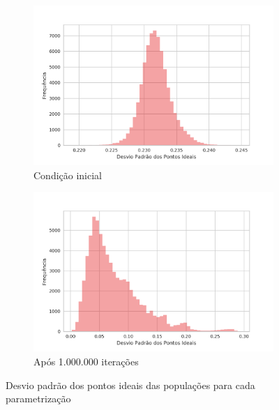 \begin{figure}[h]
    \centering
    \begin{subfigure}[b]{0.49\textwidth}
      \includegraphics[width=\textwidth]{ims/diststdinit.png}
      \caption{Condição inicial}
    \end{subfigure}
    \begin{subfigure}[b]{0.49\textwidth}
      \includegraphics[width=\textwidth]{ims/distY.png}
       \caption{Após 1.000.000 iterações}
      \end{subfigure}
      \caption{Desvio padrão dos pontos ideais das populações para cada
        parametrização}
      \label{fig:hists1}
    \end{figure}
    

%
%

